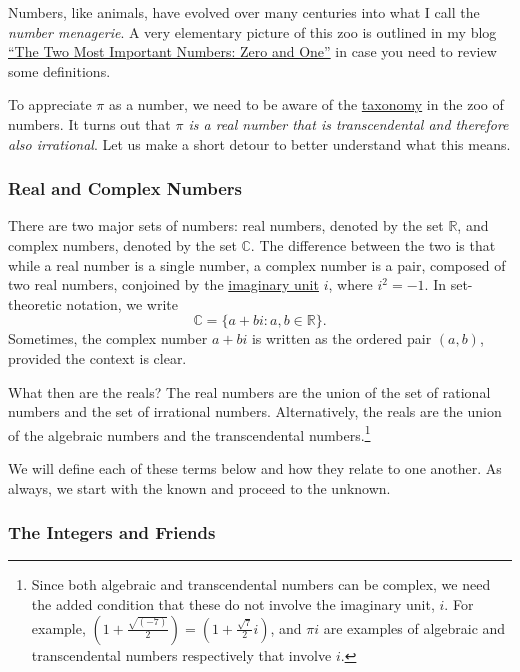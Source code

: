 \documentclass[
  a4paper,
]{article}
\begin{document}
Numbers, like animals, have evolved over many centuries into what I call
the \emph{number menagerie}. A very elementary picture of this zoo is
outlined in my blog
\href{https://swanlotus.netlify.app/blogs/the-two-most-important-numbers-zero-and-one}{``The
Two Most Important Numbers: Zero and One''} in case you need to review
some definitions.

To appreciate \(\pi\) as a number, we need to be aware of the
\href{https://www.britannica.com/science/taxonomy}{taxonomy} in the zoo
of numbers. It turns out that \emph{\(\pi\) is a real number that is
transcendental and therefore also irrational}. Let us make a short
detour to better understand what this means.

\subsubsection{Real and Complex Numbers}\label{real-and-complex-numbers}

There are two major sets of numbers: real numbers, denoted by the set
\(\mathbb{R}\), and complex numbers, denoted by the set \(\mathbb{C}\).
The difference between the two is that while a real number is a single
number, a complex number is a pair, composed of two real numbers,
conjoined by the
\href{https://en.wikipedia.org/wiki/Imaginary_unit}{imaginary unit}
\(i\), where \(i^2 = -1\). In set-theoretic notation, we write \[
\mathbb{C} = \{a + bi: a, b \in \mathbb{R}\}.
\] Sometimes, the complex number \(a + bi\) is written as the ordered
pair \((a, b)\), provided the context is clear.

What then are the reals? The real numbers are the union of the set of
rational numbers and the set of irrational numbers. Alternatively, the
reals are the union of the algebraic numbers and the transcendental
numbers.\footnote{Since both algebraic and transcendental numbers can be
  complex, we need the added condition that these do not involve the
  imaginary unit, \(i\). For example,
  \((1 + \frac{\sqrt{(-7)}}{2}) = (1 + \frac{\sqrt{7}}{2}i)\), and
  \(\pi i\) are examples of algebraic and transcendental numbers
  respectively that involve \(i\).}

We will define each of these terms below and how they relate to one
another. As always, we start with the known and proceed to the unknown.

\subsubsection{The Integers and Friends}\label{the-integers-and-friends}
\end{document}
